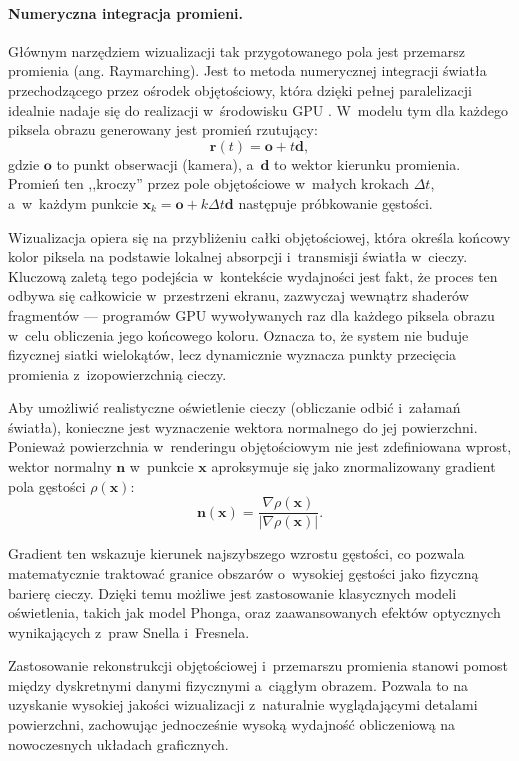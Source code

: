 \paragraph{Numeryczna integracja promieni.}
Głównym narzędziem wizualizacji tak przygotowanego pola jest przemarsz promienia (ang. Raymarching). Jest to metoda numerycznej integracji światła przechodzącego przez ośrodek objętościowy, która dzięki pełnej paralelizacji idealnie nadaje się do realizacji w~środowisku GPU \cite{tomczak2012gpu}. W~modelu tym dla każdego piksela obrazu generowany jest promień rzutujący:
    \begin{equation}
        \mathbf{r}(t) = \mathbf{o} + t\mathbf{d},
    \end{equation}
    gdzie $\mathbf{o}$ to punkt obserwacji (kamera), a~$\mathbf{d}$ to wektor kierunku promienia. Promień ten ,,kroczy'' przez pole objętościowe w~małych krokach $\Delta t$, a~w~każdym punkcie $\mathbf{x}_k = \mathbf{o} + k\Delta t \mathbf{d}$ następuje próbkowanie gęstości.

    Wizualizacja opiera się na przybliżeniu całki objętościowej, która określa 
    końcowy kolor piksela na podstawie lokalnej absorpcji i~transmisji światła w~cieczy. 
    Kluczową zaletą tego podejścia w~kontekście wydajności jest fakt, że proces ten odbywa się całkowicie w~przestrzeni ekranu, zazwyczaj wewnątrz shaderów fragmentów --- programów GPU wywoływanych raz
    dla każdego piksela obrazu w~celu obliczenia jego końcowego koloru. 
    Oznacza to, że system nie buduje fizycznej siatki wielokątów, lecz 
    dynamicznie wyznacza punkty przecięcia promienia z~izopowierzchnią cieczy\cite{quilez2013advancing}.

Aby umożliwić realistyczne oświetlenie cieczy (obliczanie odbić i~załamań światła), konieczne jest wyznaczenie wektora normalnego do jej powierzchni. Ponieważ powierzchnia w~renderingu objętościowym nie jest zdefiniowana wprost, wektor normalny $\mathbf{n}$ w~punkcie $\mathbf{x}$ aproksymuje się jako znormalizowany gradient pola gęstości $\rho(\mathbf{x})$:
\begin{equation}
    \mathbf{n}(\mathbf{x}) = \frac{\nabla \rho(\mathbf{x})}{|\nabla \rho(\mathbf{x})|}.
\end{equation}

Gradient ten wskazuje kierunek najszybszego wzrostu gęstości, co pozwala matematycznie traktować 
granice obszarów o~wysokiej gęstości jako fizyczną barierę cieczy. Dzięki temu możliwe jest 
zastosowanie klasycznych modeli oświetlenia, takich jak model Phonga, oraz zaawansowanych 
efektów optycznych wynikających z~praw Snella i~Fresnela\cite{de2006reflections}.

Zastosowanie rekonstrukcji objętościowej i~przemarszu promienia stanowi pomost między 
dyskretnymi danymi fizycznymi a~ciągłym obrazem. Pozwala to na uzyskanie wysokiej jakości 
wizualizacji z~naturalnie wyglądającymi detalami powierzchni, zachowując jednocześnie wysoką 
wydajność obliczeniową na nowoczesnych układach graficznych.
